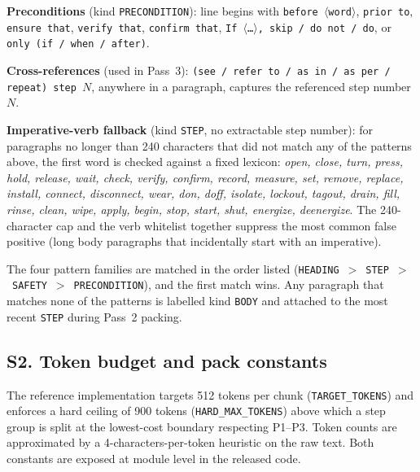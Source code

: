 \documentclass[make,article,submit,oneauthor,pdftex]{Definitions/mdpi}
\begin{document}
\textbf{Preconditions} (kind \texttt{PRECONDITION}): line begins with
\texttt{before $\langle$word$\rangle$}, \texttt{prior to},
\texttt{ensure that}, \texttt{verify that}, \texttt{confirm that},
\texttt{If~$\langle$\dots$\rangle$, skip / do not / do}, or
\texttt{only (if / when / after)}.

\textbf{Cross-references} (used in Pass~3): \texttt{(see / refer to /
as in / as per / repeat) step~$N$}, anywhere in a paragraph, captures
the referenced step number $N$.

\textbf{Imperative-verb fallback} (kind \texttt{STEP}, no extractable
step number): for paragraphs no longer than 240 characters that did
not match any of the patterns above, the first word is checked against
a fixed lexicon: \emph{open, close, turn, press, hold, release, wait,
check, verify, confirm, record, measure, set, remove, replace,
install, connect, disconnect, wear, don, doff, isolate, lockout,
tagout, drain, fill, rinse, clean, wipe, apply, begin, stop, start,
shut, energize, deenergize}. The 240-character cap and the verb whitelist
together suppress the most common false positive (long body paragraphs
that incidentally start with an imperative).

The four pattern families are matched in the order listed
(\texttt{HEADING}~$>$~\texttt{STEP}~$>$~\texttt{SAFETY}~$>$~\texttt{PRECONDITION}),
and the first match wins. Any paragraph that matches none of the
patterns is labelled kind \texttt{BODY} and attached to the most
recent \texttt{STEP} during Pass~2 packing.

\subsection{S2. Token budget and pack constants}

The reference implementation targets 512 tokens per chunk
(\texttt{TARGET\_TOKENS}) and enforces a hard ceiling of 900 tokens
(\texttt{HARD\_MAX\_TOKENS}) above which a step group is split at the
lowest-cost boundary respecting P1--P3. Token counts are approximated
by a 4-characters-per-token heuristic on the raw text. Both constants
are exposed at module level in the released code.

\vspace{6pt}

\end{document}
